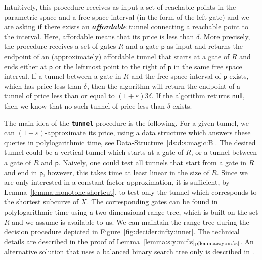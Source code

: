 \documentclass[12pt]{article}
\makeatletter
\newcommand{\AlgorithmI}[1]{{\textcolor[named]{RedViolet}{\texttt{\bf{#1}}}}}
\newcommand{\Algorithm}[1]{{\AlgorithmI{#1}\index{algorithm!#1@{\AlgorithmI{#1}}}}}
\newcommand{\lemref}[1]{Lemma~\ref{lemma:#1}}
\newcommand{\lemrefpage}[1]{Lemma~\ref{lemma:#1}$_\text{p\pageref{lemma:#1}}$}
\newcommand{\figref}[1]{Figure~\ref{fig:#1}}
\newcommand{\dsref}[1]{Data-Structure~\ref{ds:#1}}
\newcommand{\emphic}[2]{\textcolor{blue25}{\textbf{\emph{#1}}}\index{#2}}
\newcommand{\emphi}[1]{\emphic{#1}{#1}}
\newcommand{\Reached}{R}
\newcommand{\pnt}{\mathsf{p}}
\newcommand{\SimplifyX}[1]{#1}
\newcommand{\cXBase}{X} \newcommand{\cYBase}{Y} \newcommand{\crvCBase}{{\pi}}
\newcommand{\cX}{\SimplifyX{\cXBase}}
\providecommand{\eps}{{\varepsilon}}\renewcommand{\Re}{{\rm I\!\hspace{-0.025em} R}}
\newcommand{\NULL}{\ensuremath{\mathsf{null}}}
\newcommand{\tunnelTest}{\Algorithm{tunnel}\xspace}
\newcommand{\tunnel}{tunnel\xspace}
\numberwithin{figure}{section}
\numberwithin{equation}{section}
\makeatother
\begin{document}
Intuitively, this procedure receives as input a set of reachable
points in the parametric space and a free space interval (in the form
of the left gate) and we are asking if there exists an
\emphi{affordable} \tunnel connecting a reachable point to the
interval. Here, affordable means that its price is less than $\delta$.
More precisely, the procedure receives a set of gates $\Reached$ and a
gate $\pnt$ as input and returns the endpoint of an (approximately)
affordable tunnel that starts at a gate of $\Reached$ and ends either
at $\pnt$ or the leftmost point to the right of $\pnt$ in the same
free space interval.  If a tunnel between a gate in $\Reached$ and the
free space interval of $\pnt$ exists, which has price less than
$\delta$, then the algorithm will return the endpoint of a tunnel of
price less than or equal to $(1+\eps)3\delta$.  If the algorithm
returns \NULL, then we know that no such tunnel of price less than
$\delta$ exists.

The main idea of the \tunnelTest procedure is the following.  For a
given \tunnel, we can $(1+\eps)$-approximate its price, using a data
structure which answers these queries in polylogarithmic time, see
\dsref{d:s:magic:B}.  The desired tunnel could be a vertical tunnel
which starts at a gate of $\Reached$, or a tunnel between a gate of
$\Reached$ and $\pnt$.  Naively, one could test all tunnels that start
from a gate in $\Reached$ and end in $\pnt$, however, this takes time
at least linear in the size of $\Reached$. Since we are only
interested in a constant factor approximation, it is sufficient, by
\lemref{monotone:shortcut}, to test only the \tunnel which corresponds
to the shortest subcurve of $\cX$.  The corresponding gates can be
found in polylogarithmic time using a two dimensional range tree,
which is built on the set $\Reached$ and we assume is available to
us. We can maintain the range tree during the decision procedure
depicted in \figref{decider:infty:inner}. The technical details are
described in the proof of \lemrefpage{s:y:m:f:s}.  An alternative
solution that uses a balanced binary search tree only is described in
\cite{d-raapg-13}.
\end{document}
